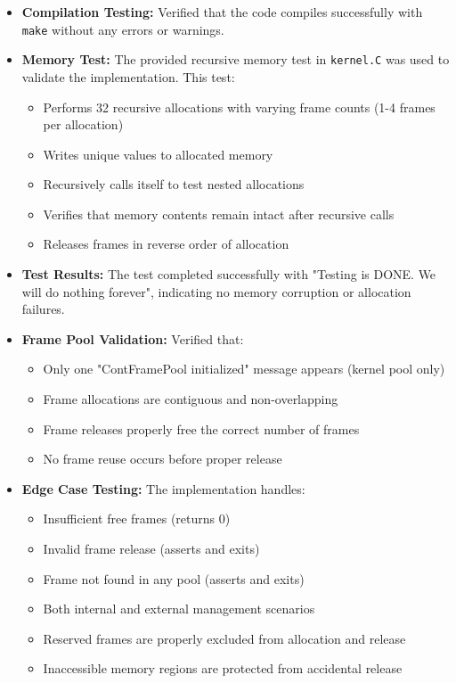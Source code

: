 \documentclass{article}
\begin{document}
\begin{itemize}
    \item \textbf{Compilation Testing:} Verified that the code compiles successfully with \texttt{make} without any errors or warnings.
    
    \item \textbf{Memory Test:} The provided recursive memory test in \texttt{kernel.C} was used to validate the implementation. This test:
    \begin{itemize}
        \item Performs 32 recursive allocations with varying frame counts (1-4 frames per allocation)
        \item Writes unique values to allocated memory
        \item Recursively calls itself to test nested allocations
        \item Verifies that memory contents remain intact after recursive calls
        \item Releases frames in reverse order of allocation
    \end{itemize}
    
    \item \textbf{Test Results:} The test completed successfully with "Testing is DONE. We will do nothing forever", indicating no memory corruption or allocation failures.
    
    \item \textbf{Frame Pool Validation:} Verified that:
    \begin{itemize}
        \item Only one "ContFramePool initialized" message appears (kernel pool only)
        \item Frame allocations are contiguous and non-overlapping
        \item Frame releases properly free the correct number of frames
        \item No frame reuse occurs before proper release
    \end{itemize}
    
    \item \textbf{Edge Case Testing:} The implementation handles:
    \begin{itemize}
        \item Insufficient free frames (returns 0)
        \item Invalid frame release (asserts and exits)
        \item Frame not found in any pool (asserts and exits)
        \item Both internal and external management scenarios
        \item Reserved frames are properly excluded from allocation and release
        \item Inaccessible memory regions are protected from accidental release
    \end{itemize}
\end{itemize}
\end{document}
